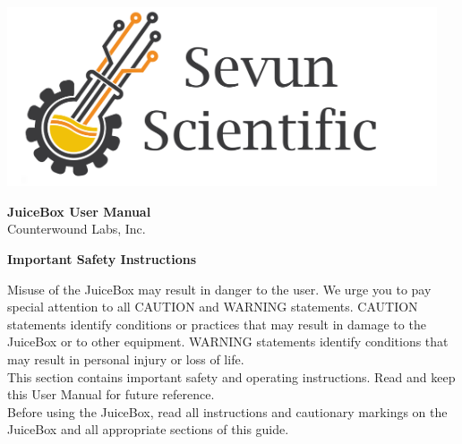 \documentclass[10pt]{article}
\begin{document}
\date{\today} 							%
\begin{titlingpage} 						%
	\centering 							%
	\includegraphics[width=5in]{ssi_logo.png}
	\vspace{2cm}						%
\begin{center}							%
	\begin{Huge}
		\textbf{JuiceBox User Manual}\\ 
		\vspace{5mm}
		Counterwound Labs, Inc.
	\end{Huge}
\end{center}
\vfill
{\Large \thedate \par} 					%
\end{titlingpage} 

\begin{flushleft}
	{\huge \textbf{Important Safety Instructions} \par}
	\vspace{1cm}

	\leftskip=3cm 						%
	\begin{large} 		
		Misuse of the JuiceBox may result in danger to the user. We urge you to
		pay special attention to all CAUTION and WARNING statements.
		CAUTION statements identify conditions or practices that may result in
		damage to the JuiceBox or to other equipment. WARNING statements
		identify conditions that may result in personal injury or loss of life.\\
		\vspace{3mm}
		This section contains important safety and operating instructions. Read
		and keep this User Manual for future reference.\\
		\vspace{3mm}
		Before using the JuiceBox, read all instructions and
		cautionary markings on the JuiceBox and all appropriate sections of
		this guide.
	\end{large}
\end{flushleft}
\end{document}
